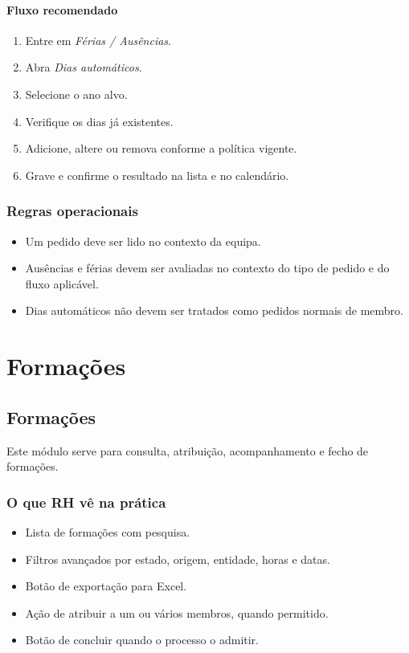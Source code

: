 \subsubsection{Fluxo recomendado}
\begin{enumerate}
  \item Entre em \textit{Férias / Ausências}.
  \item Abra \textit{Dias automáticos}.
  \item Selecione o ano alvo.
  \item Verifique os dias já existentes.
  \item Adicione, altere ou remova conforme a política vigente.
  \item Grave e confirme o resultado na lista e no calendário.
\end{enumerate}

\subsection{Regras operacionais}
\begin{itemize}
  \item Um pedido deve ser lido no contexto da equipa.
  \item Ausências e férias devem ser avaliadas no contexto do tipo de pedido e do fluxo aplicável.
  \item Dias automáticos não devem ser tratados como pedidos normais de membro.
\end{itemize}

\chapter{Formações}
\section{Formações}
Este módulo serve para consulta, atribuição, acompanhamento e fecho de formações.

\subsection{O que RH vê na prática}
\begin{itemize}
  \item Lista de formações com pesquisa.
  \item Filtros avançados por estado, origem, entidade, horas e datas.
  \item Botão de exportação para Excel.
  \item Ação de atribuir a um ou vários membros, quando permitido.
  \item Botão de concluir quando o processo o admitir.
\end{itemize}

